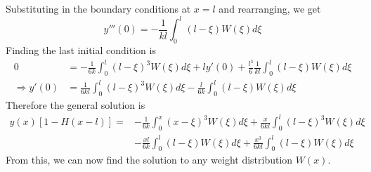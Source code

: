 \documentclass{report}
\theoremstyle{definition}
\theoremstyle{remark}
\begin{document}
Substituting in the boundary conditions at $x=l$ and rearranging, we get 
\begin{equation*}
    y'''(0)=-\frac{1}{kl}\int^l_0(l-\xi)W(\xi)d\xi
\end{equation*}
Finding the last initial condition is 
\begin{equation*}
    \begin{split}
        0&=-\frac{1}{6k}\int^l_0(l-\xi)^3W(\xi)d\xi +ly'(0)+\frac{l^3}{6}\frac{1}{kl}\int^l_0(l-\xi)W(\xi)d\xi \\
        \Rightarrow y'(0)&=\frac{1}{6kl}\int^l_0(l-\xi)^3W(\xi)d\xi - \frac{l}{6k}\int^l_0(l-\xi)W(\xi)d\xi
    \end{split}
\end{equation*}
Therefore the general solution is 
\begin{equation*}
    \begin{split}
        y(x)[1-H(x-l)] = &-\frac{1}{6k}\int^x_0(x-\xi)^3W(\xi)d\xi +\frac{x}{6kl}\int^l_0(l-\xi)^3W(\xi)d\xi \\ &- \frac{xl}{6k}\int^l_0(l-\xi)W(\xi)d\xi +\frac{x^3}{6kl}\int^l_0(l-\xi)W(\xi)d\xi
    \end{split}
\end{equation*}
From this, we can now find the solution to any weight distribution $W(x)$.
\end{document}
